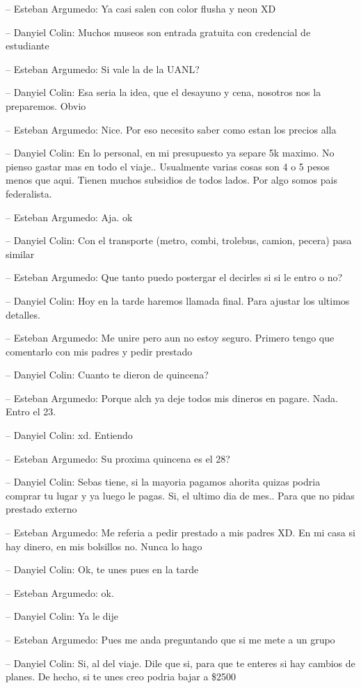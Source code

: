 -- Esteban Argumedo: Ya casi salen con color flusha y neon XD

-- Danyiel Colin: Muchos museos son entrada gratuita con credencial de
estudiante

-- Esteban Argumedo: Si vale la de la UANL?

-- Danyiel Colin: Esa seria la idea, que el desayuno y cena, nosotros
nos la preparemos. Obvio

-- Esteban Argumedo: Nice. Por eso necesito saber como estan los precios
alla

-- Danyiel Colin: En lo personal, en mi presupuesto ya separe 5k maximo.
No pienso gastar mas en todo el viaje.. Usualmente varias cosas son 4 o
5 pesos menos que aqui. Tienen muchos subsidios de todos lados. Por algo
somos pais federalista.

-- Esteban Argumedo: Aja. ok

-- Danyiel Colin: Con el transporte (metro, combi, trolebus, camion,
pecera) pasa similar

-- Esteban Argumedo: Que tanto puedo postergar el decirles si si le
entro o no?

-- Danyiel Colin: Hoy en la tarde haremos llamada final. Para ajustar
los ultimos detalles.

-- Esteban Argumedo: Me unire pero aun no estoy seguro. Primero tengo
que comentarlo con mis padres y pedir prestado

-- Danyiel Colin: Cuanto te dieron de quincena?

-- Esteban Argumedo: Porque alch ya deje todos mis dineros en pagare.
Nada. Entro el 23.

-- Danyiel Colin: xd. Entiendo

-- Esteban Argumedo: Su proxima quincena es el 28?

-- Danyiel Colin: Sebas tiene, si la mayoria pagamos ahorita quizas
podria comprar tu lugar y ya luego le pagas. Si, el ultimo dia de mes..
Para que no pidas prestado externo

-- Esteban Argumedo: Me referia a pedir prestado a mis padres XD. En mi
casa si hay dinero, en mis bolsillos no. Nunca lo hago

-- Danyiel Colin: Ok, te unes pues en la tarde

-- Esteban Argumedo: ok.

-- Danyiel Colin: Ya le dije

-- Esteban Argumedo: Pues me anda preguntando que si me mete a un grupo

-- Danyiel Colin: Si, al del viaje. Dile que si, para que te enteres si
hay cambios de planes. De hecho, si te unes creo podria bajar a \$2500

